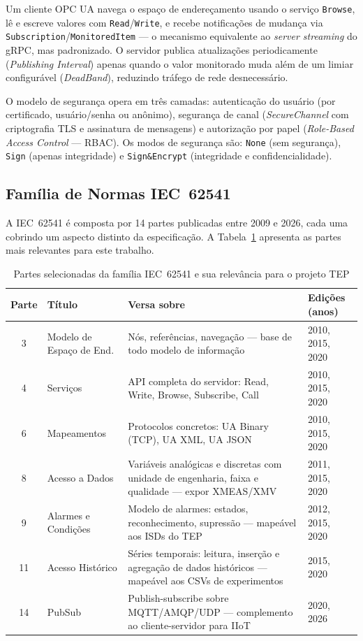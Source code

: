 Um cliente OPC UA navega o espaço de endereçamento usando o serviço \texttt{Browse}, lê e escreve valores com \texttt{Read}/\texttt{Write}, e recebe notificações de mudança via \texttt{Subscription}/\texttt{MonitoredItem} — o mecanismo equivalente ao \textit{server streaming} do gRPC, mas padronizado. O servidor publica atualizações periodicamente (\textit{Publishing Interval}) apenas quando o valor monitorado muda além de um limiar configurável (\textit{DeadBand}), reduzindo tráfego de rede desnecessário.

O modelo de segurança opera em três camadas: autenticação do usuário (por certificado, usuário/senha ou anônimo), segurança de canal (\textit{SecureChannel} com criptografia TLS e assinatura de mensagens) e autorização por papel (\textit{Role-Based Access Control} — RBAC). Os modos de segurança são: \texttt{None} (sem segurança), \texttt{Sign} (apenas integridade) e \texttt{Sign\&Encrypt} (integridade e confidencialidade).

\subsection{Família de Normas IEC~62541}

A IEC~62541 é composta por 14 partes publicadas entre 2009 e 2026, cada uma cobrindo um aspecto distinto da especificação. A Tabela~\ref{tab:iec62541} apresenta as partes mais relevantes para este trabalho.

\begin{table}[ht!]
\centering
\caption{Partes selecionadas da família IEC~62541 e sua relevância para o projeto TEP}
\label{tab:iec62541}
\begin{tabular}{|c|l|p{5.5cm}|p{3cm}|}
\hline
\textbf{Parte} & \textbf{Título} & \textbf{Versa sobre} & \textbf{Edições (anos)} \\
\hline
3 & Modelo de Espaço de End. & Nós, referências, navegação — base de todo modelo de informação & 2010, 2015, 2020 \\
\hline
4 & Serviços & API completa do servidor: Read, Write, Browse, Subscribe, Call & 2010, 2015, 2020 \\
\hline
6 & Mapeamentos & Protocolos concretos: UA Binary (TCP), UA XML, UA JSON & 2010, 2015, 2020 \\
\hline
8 & Acesso a Dados & Variáveis analógicas e discretas com unidade de engenharia, faixa e qualidade — expor XMEAS/XMV & 2011, 2015, 2020 \\
\hline
9 & Alarmes e Condições & Modelo de alarmes: estados, reconhecimento, supressão — mapeável aos ISDs do TEP & 2012, 2015, 2020 \\
\hline
11 & Acesso Histórico & Séries temporais: leitura, inserção e agregação de dados históricos — mapeável aos CSVs de experimentos & 2015, 2020 \\
\hline
14 & PubSub & Publish-subscribe sobre MQTT/AMQP/UDP — complemento ao cliente-servidor para IIoT & 2020, 2026 \\
\hline
\end{tabular}
\end{table}

